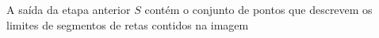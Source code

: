 \documentclass[12pt]{article}
\begin{document}
A saída da etapa anterior $S$ contém o conjunto de pontos que descrevem os limites de segmentos de retas contidos na imagem













\end{document}
